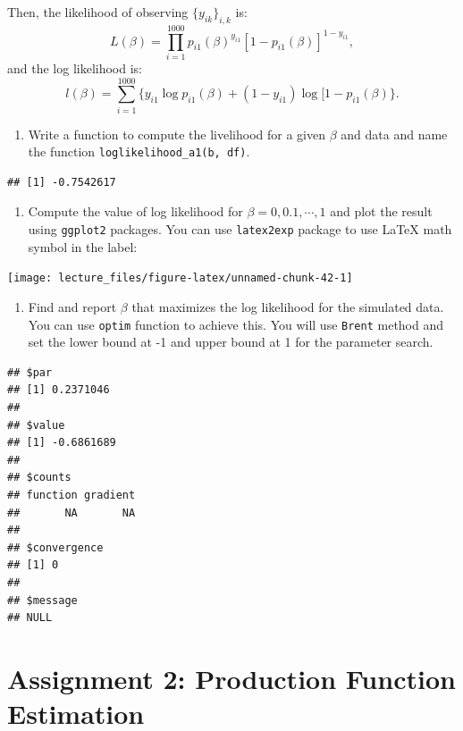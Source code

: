 \documentclass[
]{book}
\providecommand{\tightlist}{%
  \setlength{\itemsep}{0pt}\setlength{\parskip}{0pt}}
\begin{document}
Then, the likelihood of observing \(\{y_{ik}\}_{i, k}\) is:
\[
L(\beta) = \prod_{i = 1}^{1000} p_{i1}(\beta)^{y_{i1}} [1 - p_{i1}(\beta)]^{1 - y_{i1}},
\]
and the log likelihood is:
\[
l(\beta) = \sum_{i = 1}^{1000}\{y_{i1}\log p_{i1}(\beta) + (1 - y_{i1})\log [1 - p_{i1}(\beta)\}.
\]

\begin{enumerate}
\def\labelenumi{\arabic{enumi}.}
\tightlist
\item
  Write a function to compute the livelihood for a given \(\beta\) and data and name the function \texttt{loglikelihood\_a1(b,\ df)}.
\end{enumerate}

\begin{verbatim}
## [1] -0.7542617
\end{verbatim}

\begin{enumerate}
\def\labelenumi{\arabic{enumi}.}
\tightlist
\item
  Compute the value of log likelihood for \(\beta = 0, 0.1, \cdots, 1\) and plot the result using \texttt{ggplot2} packages. You can use \texttt{latex2exp} package to use LaTeX math symbol in the label:
\end{enumerate}

\begin{center}\texttt{[image: lecture\_files/figure-latex/unnamed-chunk-42-1]} \end{center}

\begin{enumerate}
\def\labelenumi{\arabic{enumi}.}
\tightlist
\item
  Find and report \(\beta\) that maximizes the log likelihood for the simulated data. You can use \texttt{optim} function to achieve this. You will use \texttt{Brent} method and set the lower bound at -1 and upper bound at 1 for the parameter search.
\end{enumerate}

\begin{verbatim}
## $par
## [1] 0.2371046
## 
## $value
## [1] -0.6861689
## 
## $counts
## function gradient 
##       NA       NA 
## 
## $convergence
## [1] 0
## 
## $message
## NULL
\end{verbatim}

\hypertarget{assignment2}{%
\chapter{Assignment 2: Production Function Estimation}\label{assignment2}}
\end{document}
